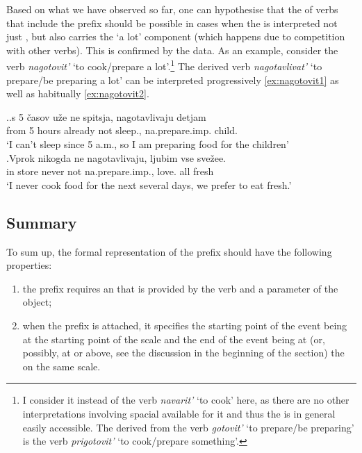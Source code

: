 Based on what we have observed so far, one can hypothesise that the  of  verbs that include the  prefix  should be possible in cases when the  is interpreted not just , but also carries the `a lot' component (which happens due to competition with other verbs). This is confirmed by the data. As an example, consider the verb \textit{nagotovit'} `to cook/prepare a lot'.\footnote{I consider it instead of the verb \textit{navarit'} `to cook' here, as there are no other interpretations involving spacial  available for it and thus the  is in general easily accessible. The  derived from the verb \textit{gotovit'} `to prepare/be preparing' is the verb \textit{prigotovit'} `to cook/prepare something'.}  The derived  verb \textit{nagotavlivat'} `to prepare/be preparing a lot' can be interpreted progressively \ref{ex:nagotovit1} as well as habitually \ref{ex:nagotovit2}.

\ex.\label{ex:nagotovit}\ag.\label{ex:nagotovit1}s 5 \v{c}asov u\v{z}e ne spitsja, nagotavlivaju detjam\\
from 5 hours already not sleep., na.prepare.imp. child.\\
\trans `I can't sleep since 5 a.m., so I am preparing food for the children'\\
\bg.\label{ex:nagotovit2}Vprok nikogda ne nagotavlivaju, ljubim vse sve\v{z}ee.\\
{in store} never not na.prepare.imp., love. all fresh\\
\trans `I never cook food for the next several days, we prefer to eat fresh.'\\

\subsection{Summary} 
To sum up, the formal representation of the  prefix  should have the following properties: 
\begin{enumerate}
\item the prefix requires an  that is provided by the verb and a parameter of the object;
\item when the prefix is attached, it specifies the starting point of the event being at the starting point of the scale and the end of the event being at (or, possibly, at or above, see the discussion in the beginning of the section) the  on the same scale.
\end{enumerate}

